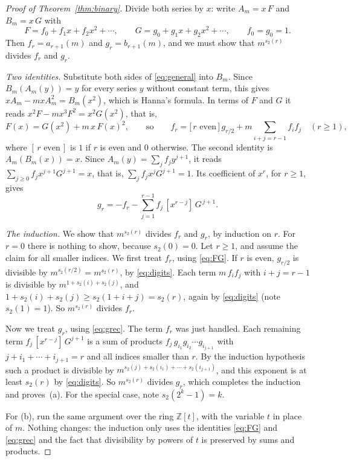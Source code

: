 \documentclass[11pt,a4paper]{article}
\theoremstyle{definition}
\theoremstyle{remark}
\newcommand{\Z}{\mathbb{Z}}
\newcommand{\coeff}[2]{[x^{#1}]\,#2}
\begin{document}
\begin{proof}[Proof of Theorem~\ref{thm:binary}]
Divide both series by $x$: write $A_m=x\,F$ and $B_m=x\,G$ with
\[
F=f_0+f_1x+f_2x^2+\cdots,\qquad G=g_0+g_1x+g_2x^2+\cdots,\qquad f_0=g_0=1 .
\]
Then $f_r=a_{r+1}(m)$ and $g_r=b_{r+1}(m)$, and we must show that $m^{s_2(r)}$ divides $f_r$ and $g_r$.

\emph{Two identities.} Substitute both sides of \eqref{eq:general} into $B_m$. Since $B_m(A_m(y))=y$ for every series
$y$ without constant term, this gives $xA_m-mxA_m^2=B_m(x^2)$, which is Hanna's formula. In terms of $F$ and $G$ it reads
$x^2F-mx^3F^2=x^2G(x^2)$, that is,
\begin{equation}\label{eq:FG}
F(x)=G(x^2)+m\,x\,F(x)^2,
\qquad\text{so}\qquad
f_r=\bigl[\,r\text{ even}\,\bigr]\,g_{r/2}+m\sum_{i+j=r-1}f_if_j\quad(r\ge1),
\end{equation}
where $[\,r\text{ even}\,]$ is $1$ if $r$ is even and $0$ otherwise. The second identity is $A_m(B_m(x))=x$. Since
$A_m(y)=\sum_jf_jy^{j+1}$, it reads $\sum_{j\ge0}f_jx^{j+1}G^{j+1}=x$, that is, $\sum_jf_jx^jG^{j+1}=1$. Its
coefficient of $x^r$, for $r\ge1$, gives
\begin{equation}\label{eq:grec}
g_r=-f_r-\sum_{j=1}^{r-1}f_j\,\coeff{r-j}{G^{\,j+1}}.
\end{equation}

\emph{The induction.} We show that $m^{s_2(r)}$ divides $f_r$ and $g_r$, by induction on $r$. For $r=0$ there is
nothing to show, because $s_2(0)=0$. Let $r\ge1$, and assume the claim for all smaller indices. We first treat $f_r$,
using \eqref{eq:FG}. If $r$ is even, $g_{r/2}$ is divisible by $m^{s_2(r/2)}=m^{s_2(r)}$, by \eqref{eq:digits}. Each
term $m\,f_if_j$ with $i+j=r-1$ is divisible by $m^{1+s_2(i)+s_2(j)}$, and
$1+s_2(i)+s_2(j)\ge s_2(1+i+j)=s_2(r)$, again by \eqref{eq:digits} (note $s_2(1)=1$). So $m^{s_2(r)}$ divides $f_r$.

Now we treat $g_r$, using \eqref{eq:grec}. The term $f_r$ was just handled. Each remaining term
$f_j\,\coeff{r-j}{G^{j+1}}$ is a sum of products $f_j\,g_{i_1}g_{i_2}\cdots g_{i_{j+1}}$ with
$j+i_1+\cdots+i_{j+1}=r$ and all indices smaller than $r$. By the induction hypothesis such a product is divisible by
$m^{s_2(j)+s_2(i_1)+\cdots+s_2(i_{j+1})}$, and this exponent is at least $s_2(r)$ by \eqref{eq:digits}. So
$m^{s_2(r)}$ divides $g_r$, which completes the induction and proves~(a). For the special case, note
$s_2(2^k-1)=k$.

For (b), run the same argument over the ring $\Z[t]$, with the variable $t$ in place of $m$. Nothing changes: the
induction only uses the identities \eqref{eq:FG} and \eqref{eq:grec} and the fact that divisibility by powers of $t$
is preserved by sums and products.
\end{proof}
\end{document}
